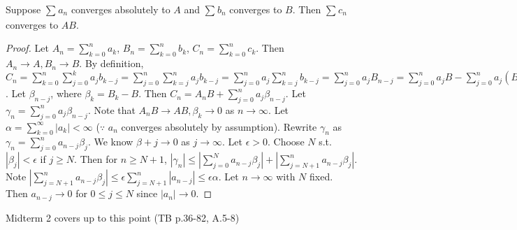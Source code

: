 \begin{theorem}[Thm 3.50]
	\label{thm:3.50}
	Suppose $\sum_{}{a_{n}}$ converges absolutely to $A$ and $\sum_{}{b_{n}}$ converges to $B$. Then $\sum_{}{c_n}$ converges to $AB$.
	\begin{proof}
		Let $A_{n}=\sum_{k=0}^{n}{a_{k}}$, $B_{n}=\sum_{k=0}^{n}{b_{k}}$, $C_{n}=\sum_{k=0}^{n}{c_{k}}$.
		Then $A_{n} \to  A, B_{n}\to B$.
		By definition, $C_{n}=\sum_{k=0}^{n}{\sum_{j=0}^{k}{a_{j}b_{k-j}}}=\sum_{j=0}^{n}{\sum_{k=j}^{n}{a_j b_{k-j}}}=\sum_{j=0}^{n}{a_{j} \sum_{k=j}^{n}{b_{k-j}}}
			=\sum_{j=0}^{n}{a_{j}B_{n-j}}=\sum_{j=0}^{n}{a_{j}B}-\sum_{j=0}^{n}{a_{j}(B_{n-j}-B)}$. Let $\beta_{n-j}$, where $\beta_k=B_k -B$.
		Then $C_n=A_nB + \sum_{j=0}^{n}{a_{j}\beta_{n-j}}$. Let $\gamma_n=\sum_{j=0}^{n}{a_{j}\beta_{n-j}}$.
		Note that $A_nB \to AB, \beta_k \to 0$ as $n\to \infty$.
		Let $\alpha=\sum_{k=0}^{\infty}{|a_k|}<\infty $  ($\because$ $a_{n}$ converges absolutely by assumption). Rewrite $\gamma_n$ as $\gamma_n=\sum_{j=0}^{n}{a_{n-j} \beta_j}$. We know $\beta+j \to 0$ as $j\to \infty$.
		Let $\epsilon>0$. Choose $N$ s.t. $|\beta_j|<\epsilon$ if $j\ge N$.
		Then for $n\ge N+1$, $|\gamma_n|\le |\sum_{j=0}^{N}{a_{n-j}\beta_j}|+|\sum_{j=N+1}^{n}{a_{n-j}\beta_j}|$. Note $|\sum_{j=N+1}^{n}{a_{n-j}\beta_j}| \le \epsilon \sum_{j=N+1}^{n}{|a_{n-j}|}\le \epsilon \alpha$.
		Let $n\to \infty$ with $N$ fixed. Then $a_{n-j}\to 0$ for $0 \le j \le N$ since $|a_{n}|\to 0$.
	\end{proof}
\end{theorem}

Midterm 2 covers up to this point (TB p.36-82, A.5-8)
